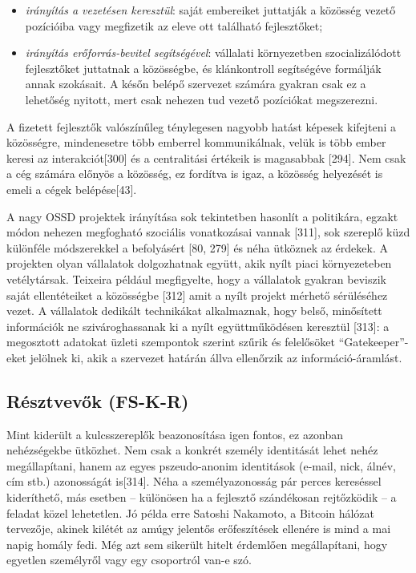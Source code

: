 \documentclass[12pt,magyar,a4paper,oneside]{scrreprt}
\providecommand{\tightlist}{%
  \setlength{\itemsep}{0pt}\setlength{\parskip}{0pt}}
\begin{document}
\begin{itemize}
\tightlist
\item
  \emph{irányítás a vezetésen keresztül}: saját embereiket juttatják a
  közösség vezető pozícióiba vagy megfizetik az eleve ott található
  fejlesztőket;
\item
  \emph{irányítás erőforrás-bevitel segítségével}: vállalati
  környezetben szocializálódott fejlesztőket juttatnak a közösségbe, és
  klánkontroll segítségéve formálják annak szokásait. A későn belépő
  szervezet számára gyakran csak ez a lehetőség nyitott, mert csak
  nehezen tud vezető pozíciókat megszerezni.
\end{itemize}

A fizetett fejlesztők valószínűleg ténylegesen nagyobb hatást képesek
kifejteni a közösségre, mindenesetre több emberrel kommunikálnak, velük
is több ember keresi az interakciót{[}300{]} és a centralitási értékeik
is magasabbak {[}294{]}. Nem csak a cég számára előnyös a közösség, ez
fordítva is igaz, a közösség helyezését is emeli a cégek
belépése{[}43{]}.

A nagy OSSD projektek irányítása sok tekintetben hasonlít a politikára,
egzakt módon nehezen megfogható szociális vonatkozásai vannak {[}311{]},
sok szereplő küzd különféle módszerekkel a befolyásért {[}80, 279{]} és
néha ütköznek az érdekek. A projekten olyan vállalatok dolgozhatnak
együtt, akik nyílt piaci környezeteben vetélytársak. Teixeira például
megfigyelte, hogy a vállalatok gyakran beviszik saját ellentéteiket a
közösségbe {[}312{]} amit a nyílt projekt mérhető sérüléséhez vezet. A
vállalatok dedikált technikákat alkalmaznak, hogy belső, minősített
információk ne szivároghassanak ki a nyílt együttműködésen keresztül
{[}313{]}: a megosztott adatokat üzleti szempontok szerint szűrik és
felelősöket ``Gatekeeper''-eket jelölnek ki, akik a szervezet határán
állva ellenőrzik az információ-áramlást.

\hypertarget{sec:FS-K-R}{%
\subsection{Résztvevők (FS-K-R)}\label{sec:FS-K-R}}

Mint kiderült a kulcsszereplők beazonosítása igen fontos, ez azonban
nehézségekbe ütközhet. Nem csak a konkrét személy identitását lehet
nehéz megállapítani, hanem az egyes pszeudo-anonim identitások (e-mail,
nick, álnév, cím stb.) azonosságát is{[}314{]}. Néha a személyazonosság
pár perces kereséssel kideríthető, más esetben -- különösen ha a
fejlesztő szándékosan rejtőzködik -- a feladat közel lehetetlen. Jó
példa erre Satoshi Nakamoto, a Bitcoin hálózat tervezője, akinek kilétét
az amúgy jelentős erőfeszítések ellenére is mind a mai napig homály
fedi. Még azt sem sikerült hitelt érdemlően megállapítani, hogy egyetlen
személyről vagy egy csoportról van-e szó.
\end{document}
